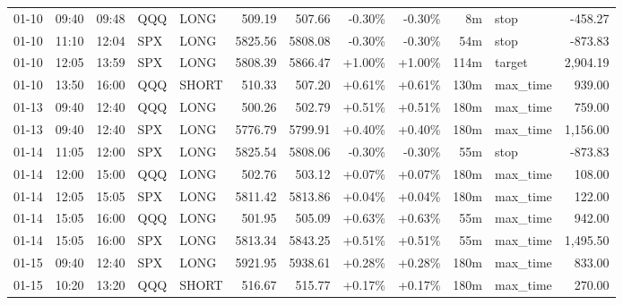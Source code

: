 \documentclass[11pt,a4paper,twoside]{article}
\begin{document}
\begin{center}
\begin{longtable}{>{\color{txtmain}}l l l l l r r r r r >{\color{txtmain}}l r}
01-10 & 09:40 & 09:48 & QQQ & LONG & 509.19 & 507.66 & \textcolor{lossred}{-0.30\%} & \textcolor{lossred}{-0.30\%} & 8m & stop & \textcolor{lossred}{-458.27} \\
01-10 & 11:10 & 12:04 & SPX & LONG & 5825.56 & 5808.08 & \textcolor{lossred}{-0.30\%} & \textcolor{lossred}{-0.30\%} & 54m & stop & \textcolor{lossred}{-873.83} \\
01-10 & 12:05 & 13:59 & SPX & LONG & 5808.39 & 5866.47 & \textcolor{wingreen}{+1.00\%} & \textcolor{wingreen}{+1.00\%} & 114m & target & \textcolor{wingreen}{2,904.19} \\
01-10 & 13:50 & 16:00 & QQQ & SHORT & 510.33 & 507.20 & \textcolor{wingreen}{+0.61\%} & \textcolor{wingreen}{+0.61\%} & 130m & max\_time & \textcolor{wingreen}{939.00} \\
01-13 & 09:40 & 12:40 & QQQ & LONG & 500.26 & 502.79 & \textcolor{wingreen}{+0.51\%} & \textcolor{wingreen}{+0.51\%} & 180m & max\_time & \textcolor{wingreen}{759.00} \\
01-13 & 09:40 & 12:40 & SPX & LONG & 5776.79 & 5799.91 & \textcolor{wingreen}{+0.40\%} & \textcolor{wingreen}{+0.40\%} & 180m & max\_time & \textcolor{wingreen}{1,156.00} \\
01-14 & 11:05 & 12:00 & SPX & LONG & 5825.54 & 5808.06 & \textcolor{lossred}{-0.30\%} & \textcolor{lossred}{-0.30\%} & 55m & stop & \textcolor{lossred}{-873.83} \\
01-14 & 12:00 & 15:00 & QQQ & LONG & 502.76 & 503.12 & \textcolor{wingreen}{+0.07\%} & \textcolor{wingreen}{+0.07\%} & 180m & max\_time & \textcolor{wingreen}{108.00} \\
01-14 & 12:05 & 15:05 & SPX & LONG & 5811.42 & 5813.86 & \textcolor{wingreen}{+0.04\%} & \textcolor{wingreen}{+0.04\%} & 180m & max\_time & \textcolor{wingreen}{122.00} \\
01-14 & 15:05 & 16:00 & QQQ & LONG & 501.95 & 505.09 & \textcolor{wingreen}{+0.63\%} & \textcolor{wingreen}{+0.63\%} & 55m & max\_time & \textcolor{wingreen}{942.00} \\
01-14 & 15:05 & 16:00 & SPX & LONG & 5813.34 & 5843.25 & \textcolor{wingreen}{+0.51\%} & \textcolor{wingreen}{+0.51\%} & 55m & max\_time & \textcolor{wingreen}{1,495.50} \\
01-15 & 09:40 & 12:40 & SPX & LONG & 5921.95 & 5938.61 & \textcolor{wingreen}{+0.28\%} & \textcolor{wingreen}{+0.28\%} & 180m & max\_time & \textcolor{wingreen}{833.00} \\
01-15 & 10:20 & 13:20 & QQQ & SHORT & 516.67 & 515.77 & \textcolor{wingreen}{+0.17\%} & \textcolor{wingreen}{+0.17\%} & 180m & max\_time & \textcolor{wingreen}{270.00} \\

\end{longtable}
\end{center}
\end{document}
